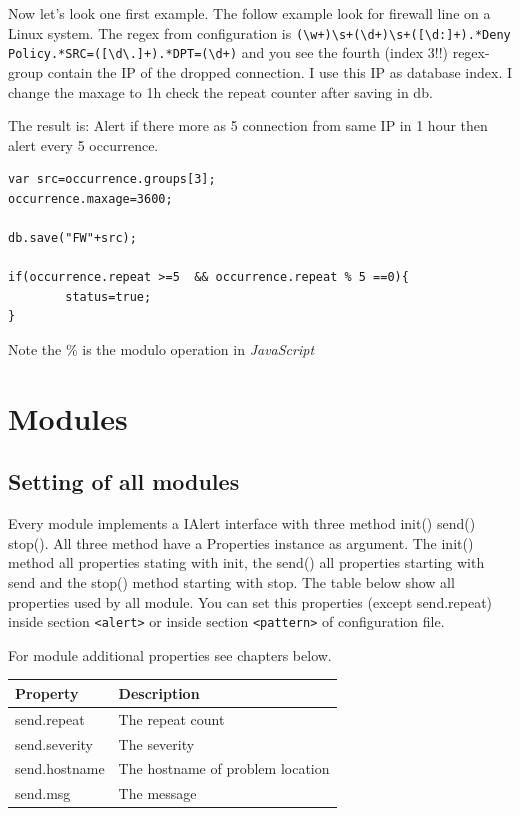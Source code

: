 \documentclass[11pt,a4paper]{article}
\newcommand{\js}{\textit{JavaScript\ }}
\begin{document}
Now let's look one first example. The follow example look for firewall line on a
Linux system. The regex from configuration is
\verb#(\w+)\s+(\d+)\s+([\d:]+).*Deny Policy.*SRC=([\d\.]+).*DPT=(\d+)# and you
see the fourth (index 3!!) regex-group contain the IP of the dropped connection.
I use this IP as database index. I change the maxage to 1h check the repeat
counter after saving in db.

The result is: Alert if there more as 5 connection
from same IP in 1 hour then alert every 5 occurrence.

\begin{samepage}
\begin{verbatim}
var src=occurrence.groups[3];
occurrence.maxage=3600;

db.save("FW"+src);

if(occurrence.repeat >=5  && occurrence.repeat % 5 ==0){
        status=true;
}
\end{verbatim}
\end{samepage}

Note the \% is the modulo operation in \js

\section{Modules}
\label{sec:modules}

\subsection{Setting of all modules}

Every module implements a IAlert interface with three method init() send() stop(). All three method
have a Properties instance as argument. The init() method all properties stating with init, the send()
all properties starting with send and the stop() method starting with stop. The table below show
all properties used by all module.  You can set this properties (except send.repeat) inside section \verb#<alert># or inside
section \verb#<pattern># of configuration file.

For module additional properties see chapters below.

\begin{tabular}{l|p{}}
  Property 	& Description\\\hline
  send.repeat  	    & The repeat count \\
  send.severity 	& The severity \\
  send.hostname 	& The hostname of problem location\\
  send.msg 	        & The message\\
\end{tabular}
\end{document}

